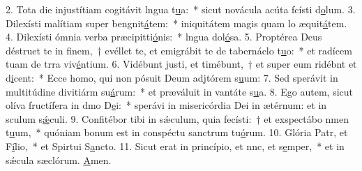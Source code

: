 2. Tota die injustítiam cogitávit lngua t\uline{u}a:~* sicut novácula acúta fcísti d\uline{o}lum.
3. Dilexísti malítiam super bengnit\uline{á}tem:~* iniquitátem magis quam lo æquit\uline{á}tem.
4. Dilexísti ómnia verba præcipitti\uline{ó}nis:~* lngua dol\uline{ó}sa.
5. Proptérea Deus déstruet te in finem,~† evéllet te, et emigrábit te de tabernáclo t\uline{u}o:~* et radícem tuam de trra viv\uline{é}ntium.
6. Vidébunt justi, et timébunt,~† et super eum ridébnt et d\uline{i}cent:~* Ecce homo, qui non pósuit Deum adjtórem s\uline{u}um:
7. Sed sperávit in multitúdine divitiárm su\uline{á}rum:~* et præváluit in vantáte s\uline{u}a.
8. Ego autem, sicut olíva fructífera in dmo D\uline{e}i:~* sperávi in misericórdia Dei in ætérnum: et in sculum s\uline{ǽ}culi.
9. Confitébor tibi in sǽculum, quia fecísti:~† et exspectábo nmen t\uline{u}um,~* quóniam bonum est in conspéctu sanctrum tu\uline{ó}rum.
10. Glória Patr, et F\uline{í}lio,~* et Spirtui S\uline{a}ncto.
11. Sicut erat in princípio, et nnc, et s\uline{e}mper,~* et in sǽcula sæclórum. \uline{A}men.
